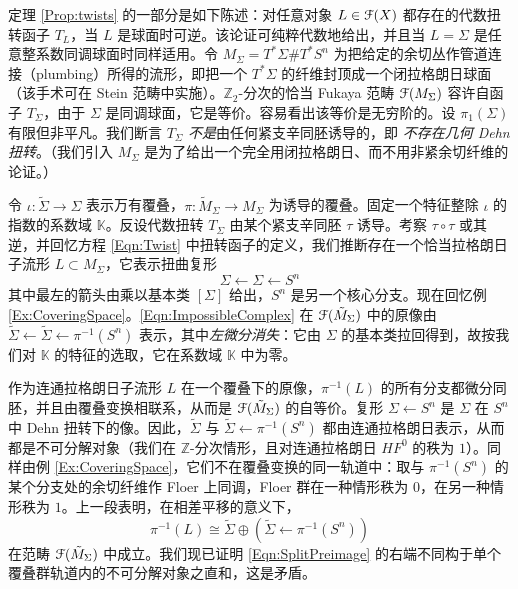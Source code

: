 \documentclass[11pt,a4paper]{article}
\numberwithin{equation}{section}
\newcommand{\bZ}{\mathbb{Z}}
\newcommand{\bK}{\mathbb{K}}
\newcommand{\scrF}{\EuScript{F}}
\begin{document}
定理 \ref{Prop:twists} 的一部分是如下陈述：对任意对象 $L \in \scrF(X)$ 都存在的代数扭转函子 $T_L$，当 $L$ 是球面时可逆。该论证可纯粹代数地给出，并且当 $L=\Sigma$ 是任意整系数同调球面时同样适用。令 $M_{\Sigma} = T^*\Sigma\#T^*S^n$ 为把给定的余切丛作管道连接（plumbing）所得的流形，即把一个 $T^*\Sigma$ 的纤维封顶成一个闭拉格朗日球面（该手术可在 Stein 范畴中实施）。$\bZ_2$-分次的恰当 Fukaya 范畴 $\scrF(M_{\Sigma})$ 容许自函子 $T_{\Sigma}$，由于 $\Sigma$ 是同调球面，它是等价。容易看出该等价是无穷阶的。设 $\pi_1(\Sigma)$ 有限但非平凡。我们断言 $T_{\Sigma}$ \emph{不是}由任何紧支辛同胚诱导的，即 \emph{不存在几何 Dehn 扭转}。（我们引入 $M_\Sigma$ 是为了给出一个完全用闭拉格朗日、而不用非紧余切纤维的论证。）

令 $\iota: \tilde{\Sigma} \rightarrow \Sigma$ 表示万有覆叠，$\pi: \tilde{M}_{\Sigma} \rightarrow M_{\Sigma}$ 为诱导的覆叠。固定一个特征整除 $\iota$ 的指数的系数域 $\bK$。反设代数扭转 $T_{\Sigma}$ 由某个紧支辛同胚 $\tau$ 诱导。考察 $\tau \circ \tau$ 或其逆，并回忆方程 \ref{Eqn:Twist} 中扭转函子的定义，我们推断存在一个恰当拉格朗日子流形 $L \subset M_{\Sigma}$，它表示扭曲复形
\begin{equation} \label{Eqn:ImpossibleComplex}
\Sigma \leftarrow \Sigma \leftarrow S^n
\end{equation}
其中最左的箭头由乘以基本类 $[\Sigma]$ 给出，$S^n$ 是另一个核心分支。现在回忆例 \ref{Ex:CoveringSpace}。\eqref{Eqn:ImpossibleComplex} 在 $\scrF(\tilde{M}_{\Sigma})$ 中的原像由 $\tilde{\Sigma} \leftarrow \tilde{\Sigma} \leftarrow \pi^{-1}(S^n)$ 表示，其中\emph{左微分消失}：它由 $\Sigma$ 的基本类拉回得到，故按我们对 $\bK$ 的特征的选取，它在系数域 $\bK$ 中为零。

作为连通拉格朗日子流形 $L$ 在一个覆叠下的原像，$\pi^{-1}(L)$ 的所有分支都微分同胚，并且由覆叠变换相联系，从而是 $\scrF(\tilde{M}_{\Sigma})$ 的自等价。复形 $\Sigma \leftarrow S^n$ 是 $\Sigma$ 在 $S^n$ 中 Dehn 扭转下的像。因此，$\tilde{\Sigma}$ 与 $\tilde{\Sigma} \leftarrow \pi^{-1}(S^n)$ 都由连通拉格朗日表示，从而都是不可分解对象（我们在 $\bZ$-分次情形，且对连通拉格朗日 $HF^0$ 的秩为 $1$）。同样由例 \ref{Ex:CoveringSpace}，它们不在覆叠变换的同一轨道中：取与 $  \pi^{-1}(S^n)$ 的某个分支处的余切纤维作 Floer 上同调，Floer 群在一种情形秩为 $0$，在另一种情形秩为 $1$。上一段表明，在相差平移的意义下，
\begin{equation} \label{Eqn:SplitPreimage}
\pi^{-1}(L) \cong \tilde{\Sigma} \oplus \left( \tilde{\Sigma} \leftarrow \pi^{-1}(S^n) \right)
\end{equation}
在范畴 $\scrF(\tilde{M}_{\Sigma})$ 中成立。我们现已证明 \eqref{Eqn:SplitPreimage} 的右端不同构于单个覆叠群轨道内的不可分解对象之直和，这是矛盾。
\end{document}
